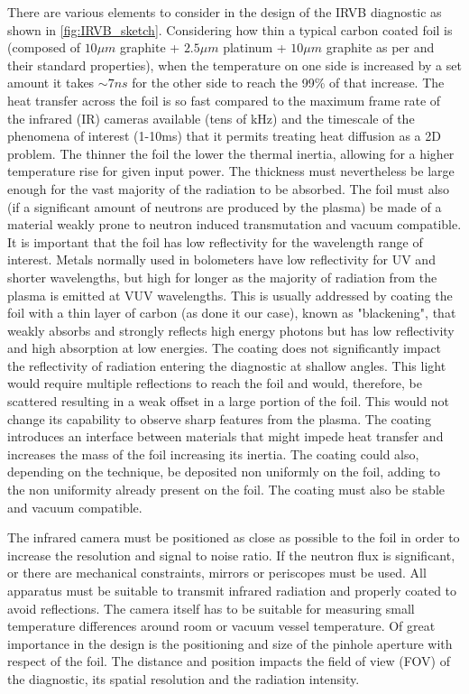 There are various elements to consider in the design of the IRVB diagnostic as shown in \autoref{fig:IRVB_sketch}.
Considering how thin a typical carbon coated foil is (composed of $10\mu m$ graphite + $2.5\mu m$ platinum + $10\mu m$ graphite as per \cite{Pandya2014} and their standard properties), when the temperature on one side is increased by a set amount it takes $\sim7ns$ for the other side to reach the 99\% of that increase. The heat transfer across the foil is so fast compared to the maximum frame rate of the infrared (IR) cameras available (tens of kHz) and the timescale of the phenomena of interest (1-10ms) that it permits treating heat diffusion as a 2D problem. The thinner the foil the lower the thermal inertia, allowing for a higher temperature rise for given input power. The thickness must nevertheless be large enough for the vast majority of the radiation to be absorbed. The foil must also (if a significant amount of neutrons are produced by the plasma) be made of a material weakly prone to neutron induced transmutation and vacuum compatible.\cite{Mukai2021}
It is important that the foil has low reflectivity for the wavelength range of interest. Metals normally used in bolometers have low reflectivity for UV and shorter wavelengths, but high for longer as the majority of radiation from the plasma is emitted at VUV wavelengths. This is usually addressed by coating the foil with a thin layer of carbon (as done it our case), known as "blackening", that weakly absorbs and strongly reflects high energy photons but has low reflectivity and high absorption at low energies. The coating does not significantly impact the reflectivity of radiation entering the diagnostic at shallow angles. This light would require multiple reflections to reach the foil and would, therefore, be scattered resulting in a weak offset in a large portion of the foil. This would not change its capability to observe sharp features from the plasma. The coating introduces an interface between materials that might impede heat transfer and increases the mass of the foil increasing its inertia. The coating could also, depending on the technique, be deposited non uniformly on the foil, adding to the non uniformity already present on the foil. The coating must also be stable and vacuum compatible. \cite{Mukai2016}

The infrared camera must be positioned as close as possible to the foil in order to increase the resolution and signal to noise ratio. If the neutron flux is significant, or there are mechanical constraints, mirrors or periscopes must be used. All apparatus must be suitable to transmit infrared radiation and properly coated to avoid reflections. The camera itself has to be suitable for measuring small temperature differences around room or vacuum vessel temperature.
Of great importance in the design is the positioning and size of the pinhole aperture with respect of the foil. The distance and position impacts the field of view (FOV) of the diagnostic, its spatial resolution and the radiation intensity.


